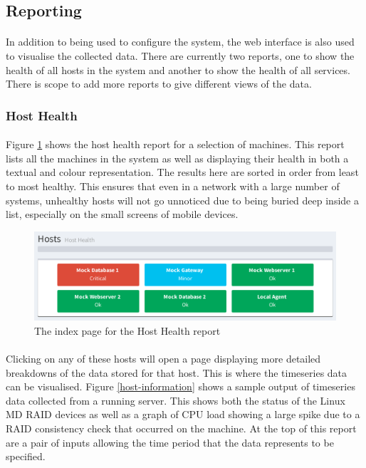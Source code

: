 \documentclass[bsc,logo,twoside]{infthesis}
\begin{document}
\subsection{Reporting}
\paragraph*{}
	In addition to being used to configure the system, the web interface is also
	used to visualise the collected data.  There are currently two reports, one
	to show the health of all hosts in the system and another to show the health
	of all services.  There is scope to add more reports to give different views
	of the data.  
\subsubsection{Host Health}
\paragraph*{}
	Figure \ref{host-health-index} shows the host health report for
	a selection of machines.  This report lists all the machines in the system
	as well as displaying their health in both a textual and colour representation.
	The results here are sorted in order from least to most healthy.  This ensures
	that even in a network with a large number of systems, unhealthy hosts will not
	go unnoticed due to being buried deep inside a list, especially on the small
	screens of mobile devices.
	
\begin{figure}[H]
	\centering
	\caption{The index page for the Host Health report}
	\label{host-health-index}
	\includegraphics[scale=0.7]{assets/screenshots/host-health-index.pdf}
\end{figure}

\paragraph*{}
	Clicking on any of these hosts will open a page displaying more detailed
	breakdowns of the data stored for that host.  This is where the timeseries
	data can be visualised.  Figure \ref{host-information} shows a sample
	output of timeseries data collected from a running server.  This shows both
	the status of the Linux MD RAID devices as well as a graph of CPU load
	showing a large spike due to a RAID consistency check that occurred on the
	machine.  At the top of this report are a pair of inputs allowing the time
	period that the data represents to be specified.
\end{document}
